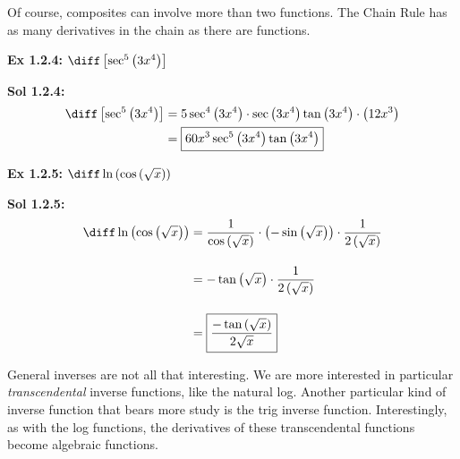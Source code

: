 Of course, composites can involve more than two functions. The Chain Rule has as many derivatives in the chain as there are functions. \par

\begin{tcolorbox}[example]
    \textbf{Ex 1.2.4: } $\diff \left[\sec^5 \left(3x^4\right)\right]$ 
\end{tcolorbox}
\begin{tcolorbox}[solution]
    \textbf{Sol 1.2.4: } \begin{align*}
        \diff \left[\sec^5 \left(3x^4\right)\right] & = 5\sec^4 \left(3x^4\right) \cdot \sec \left(3x^4\right) \tan \left(3x^4\right) \cdot \left(12x^3\right) \\
        & = \boxed{60x^3\sec^5 \left(3x^4\right)\tan \left(3x^4\right)}
    \end{align*}
\end{tcolorbox} \vspace{11pt}

\begin{tcolorbox}[example]
    \textbf{Ex 1.2.5: } $\diff \ln \left(\cos \left(\sqrt{x}\right)\right)$ 
\end{tcolorbox}
\begin{tcolorbox}[solution]
    \textbf{Sol 1.2.5: } \begin{align*}
        \diff \ln \left(\cos \left(\sqrt{x}\right)\right) & = \dfrac{1}{\cos \left(\sqrt{x}\right)} \cdot \left(-\sin \left(\sqrt{x}\right)\right) \cdot \dfrac{1}{2\left(\sqrt{x}\right)} \\[11pt]
        & = -\tan \left(\sqrt{x}\right) \cdot \dfrac{1}{2\left(\sqrt{x}\right)} \\[11pt]
        & = \boxed{\dfrac{-\tan \left(\sqrt{x}\right)}{2\sqrt{x}}}
    \end{align*}
\end{tcolorbox}

General inverses are not all that interesting. We are more interested in particular \textit{transcendental} inverse functions, like the natural log. Another particular kind of inverse function that bears more study is the trig inverse function. Interestingly, as with the log functions, the derivatives of these transcendental functions become algebraic functions. \par

